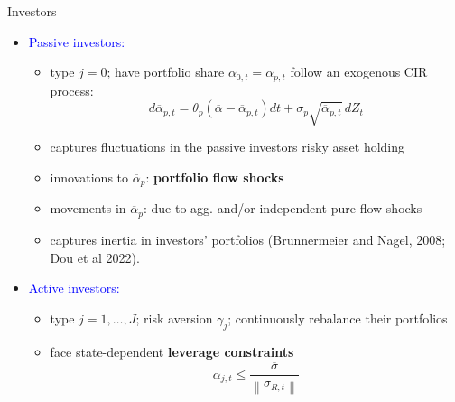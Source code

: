 \begin{frame}{Investors}
\begin{itemize}
    \item \textcolor{blue}{Passive investors:}\vspM
    \begin{itemize}
        \item  type $j=0$; have portfolio share $\alpha_{0,t}=\overline{\alpha}_{p,t}$ follow an exogenous CIR process:
        \[d \overline{\alpha}_{p, t}=\theta_{p}\left(\overline{\alpha}-\overline{\alpha}_{p, t}\right) d t+\sigma_{p} \sqrt{\overline{\alpha}_{p, t}}\, d Z_{t}\]
        \item captures fluctuations in the passive investors risky asset holding\vspM
        \item innovations to $\overline{\alpha}_p$: \textbf{portfolio flow shocks}\vspM
        \item movements in $\overline{\alpha}_p$: due to agg. and/or independent pure flow shocks\vspM
        \item captures inertia in investors' portfolios {\scriptsize(Brunnermeier and Nagel, 2008; Dou et al 2022)}.
    
    \end{itemize}\pause
    \item \textcolor{blue}{Active investors:} \vspM
    \begin{itemize}
        \item type $j=1,\ldots,J$; risk aversion $\gamma_j$; continuously rebalance their portfolios\vspM
        \item face state-dependent \textbf{leverage constraints}
        \[\alpha_{j, t} \leq \frac{\overline{\sigma}}{\left\|\sigma_{R, t}\right\|}\]
    \end{itemize}
\end{itemize}
\end{frame}

